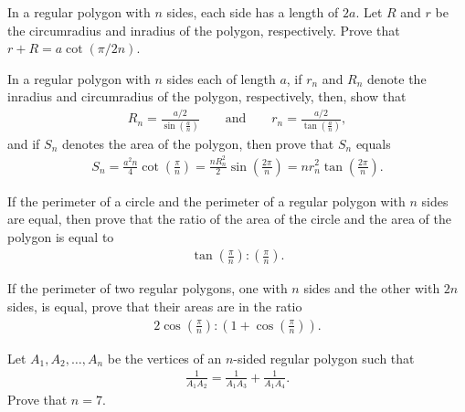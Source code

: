 \documentclass[12pt,a4paper]{memoir}
\theoremstyle{definition}
\begin{document}
\begin{question}
	In a regular polygon with $n$ sides, each side has a length of $2a$. Let $R$ and $r$ be the circumradius and inradius of the polygon, respectively. Prove that $r + R = a \cot\left(\pi/2n\right)$.
\end{question}


	\begin{question}[name={Inradius, Circumradius, and Area of Regular Polygons}]
		In a regular polygon with $n$ sides each of length $a$, if $r_n$ and $R_n$ denote the inradius and circumradius of the polygon, respectively, then, show that
		\begin{align*}
			R_n = \frac{a/2}{\displaystyle\sin\left(\frac{a}{n}\right)} \qquad \text{and} \qquad
			r_n = \frac{a/2}{\displaystyle\tan\left(\frac{a}{n}\right)},
		\end{align*}
		and if $S_n$ denotes the area of the polygon, then prove that $S_n$ equals
		\begin{align*}
			S_n = \frac{a^2n}{4}\cot\left(\frac{\pi}{n}\right) = \frac{nR_n^2}{2}\sin\left(\frac{2\pi}{n}\right) = nr_n^2\tan\left(\frac{2\pi}{n}\right).
		\end{align*}
	\end{question}




\begin{question}
	If the perimeter of a circle and the perimeter of a regular polygon with $n$ sides are equal, then prove that the ratio of the area of the circle and the area of the polygon is equal to
	\begin{align*}
		\tan\left(\frac{\pi}{n}\right):\left(\frac{\pi}{n}\right).
	\end{align*}
\end{question}

\begin{question}
	If the perimeter of two regular polygons, one with $n$ sides and the other with $2n$ sides, is equal, prove that their areas are in the ratio
	\begin{align*}
		2\cos\left(\frac{\pi}{n}\right) : \left(1+\cos\left(\frac{\pi}{n}\right)\right).
	\end{align*}
\end{question}

\begin{question}
	Let $A_1,A_2,\dots,A_n$ be the vertices of an $n$-sided regular polygon such that
	\begin{align*}
		\frac{1}{A_1A_2} = \frac{1}{A_1A_3} + \frac{1}{A_1A_4}.
	\end{align*}
	Prove that $n=7$.
\end{question}
\end{document}
